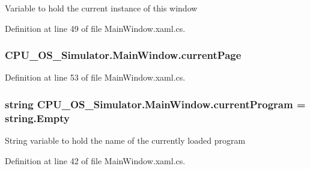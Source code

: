 Variable to hold the current instance of this window 



Definition at line 49 of file Main\+Window.\+xaml.\+cs.

\hypertarget{class_c_p_u___o_s___simulator_1_1_main_window_a14f6732faabdb632f3d29dbcbbb7059d}{}
\subsubsection[{current\+Page}]{ C\+P\+U\+\_\+\+O\+S\+\_\+\+Simulator.\+Main\+Window.\+current\+Page\hspace{0.3cm}{\ttfamily [private]}}\label{class_c_p_u___o_s___simulator_1_1_main_window_a14f6732faabdb632f3d29dbcbbb7059d}


Definition at line 53 of file Main\+Window.\+xaml.\+cs.

\hypertarget{class_c_p_u___o_s___simulator_1_1_main_window_a91f063d9cf776004dc74e719ef942907}{}
\subsubsection[{current\+Program}]{\setlength{\rightskip}{0pt plus 5cm}string C\+P\+U\+\_\+\+O\+S\+\_\+\+Simulator.\+Main\+Window.\+current\+Program = string.\+Empty}\label{class_c_p_u___o_s___simulator_1_1_main_window_a91f063d9cf776004dc74e719ef942907}


String variable to hold the name of the currently loaded program 



Definition at line 42 of file Main\+Window.\+xaml.\+cs.

\hypertarget{class_c_p_u___o_s___simulator_1_1_main_window_a5115439e688bb7ed25f5237b266e4f3f}{}
